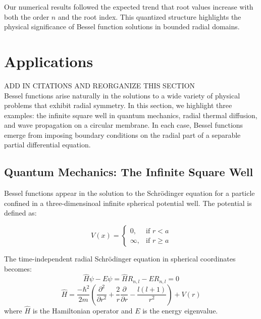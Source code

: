 \documentclass[linenumbers, twocolumn]{aastex631}
\begin{document}
\noindent Our numerical results followed the expected trend that root values
increase with both the order $n$ and the root index. This quantized structure
highlights the physical significance of Bessel function solutions in bounded
radial domains.


\section{Applications} \label{sec:applications}

ADD IN CITATIONS AND REORGANIZE THIS SECTION\\

Bessel functions arise naturally in the solutions to a wide variety of physical
problems that exhibit radial symmetry. In this section, we highlight three
examples: the infinite square well in quantum mechanics, radial thermal
diffusion, and wave propagation on a circular membrane. In each case, Bessel
functions emerge from imposing boundary conditions on the radial part of a 
separable partial differential equation.

\subsection{Quantum Mechanics: The Infinite Square Well}

Bessel functions appear in the solution to the Schrödinger equation for a
particle confined in a three-dimensinoal infinite spherical potential well.
The potential is defined as:

\begin{equation}
    V(x)=
    \begin{cases}
        0, &\text{if }r < a\\
        \infty, &\text{if }r\geq a
    \end{cases}
\end{equation}

The time-independent radial Schrödinger equation in spherical coordinates becomes:
\begin{equation}
    \hat{H}\psi-E\psi=\hat{H}R_{n,l}-ER_{n,l}=0
\end{equation}
\begin{equation}
    \hat{H}=\frac{-\hbar ^2}{2m}\left(\frac{\partial^2}{\partial r^2} + \frac{2}{r} \frac{\partial}{\partial r} - \frac{l(l+1)}{r^2}\right) +V(r)
\end{equation}
\noindent where $\hat{H}$ is the Hamiltonian operator and $E$ is the energy eigenvalue.
\end{document}
